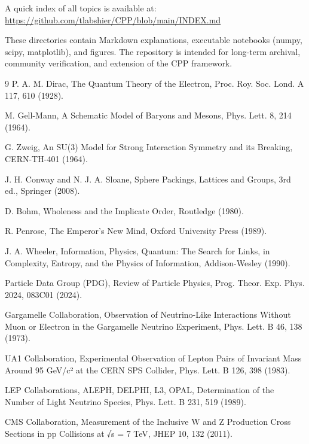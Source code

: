 \documentclass{article}
\begin{document}
A quick index of all topics is available at:  
\url{https://github.com/tlabshier/CPP/blob/main/INDEX.md}

These directories contain Markdown explanations, executable notebooks (numpy, scipy, matplotlib), and figures. The repository is intended for long-term archival, community verification, and extension of the CPP framework.

\begin{thebibliography}{9}
P. A. M. Dirac, The Quantum Theory of the Electron, Proc. Roy. Soc. Lond. A 117, 610 (1928).

M. Gell-Mann, A Schematic Model of Baryons and Mesons, Phys. Lett. 8, 214 (1964).

G. Zweig, An SU(3) Model for Strong Interaction Symmetry and its Breaking, CERN-TH-401 (1964).

J. H. Conway and N. J. A. Sloane, Sphere Packings, Lattices and Groups, 3rd ed., Springer (2008).

D. Bohm, Wholeness and the Implicate Order, Routledge (1980).

R. Penrose, The Emperor's New Mind, Oxford University Press (1989).

J. A. Wheeler, Information, Physics, Quantum: The Search for Links, in Complexity, Entropy, and the Physics of Information, Addison-Wesley (1990).

Particle Data Group (PDG), Review of Particle Physics, Prog. Theor. Exp. Phys. 2024, 083C01 (2024).

Gargamelle Collaboration, Observation of Neutrino-Like Interactions Without Muon or Electron in the Gargamelle Neutrino Experiment, Phys. Lett. B 46, 138 (1973).

UA1 Collaboration, Experimental Observation of Lepton Pairs of Invariant Mass Around 95 GeV/c² at the CERN SPS Collider, Phys. Lett. B 126, 398 (1983).

LEP Collaborations, ALEPH, DELPHI, L3, OPAL, Determination of the Number of Light Neutrino Species, Phys. Lett. B 231, 519 (1989).

CMS Collaboration, Measurement of the Inclusive W and Z Production Cross Sections in pp Collisions at √s = 7 TeV, JHEP 10, 132 (2011).


\end{thebibliography}
\end{document}
